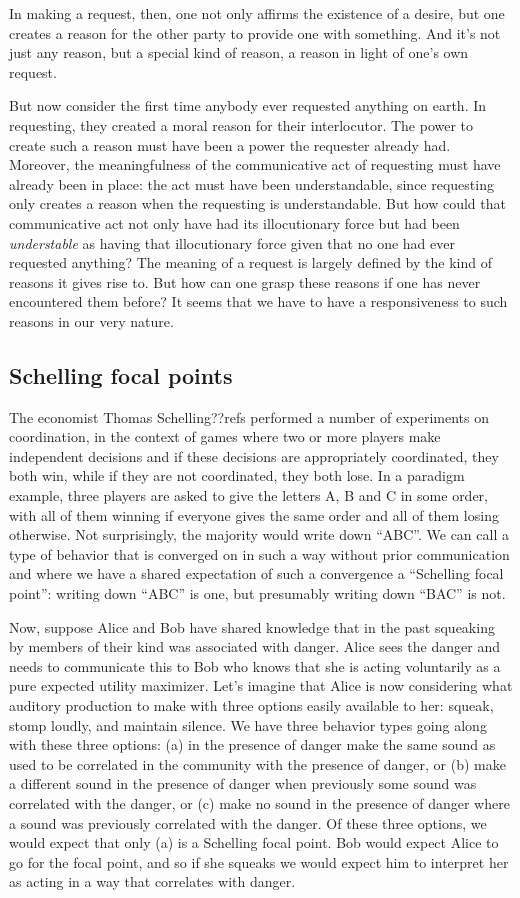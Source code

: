 In making a request, then, one not only affirms the existence of a desire, but one creates a reason for the other 
party to provide one with something. And it's not just any reason, but a special kind of reason, a reason in light of one's own request.

But now consider the first time anybody ever requested anything on earth. In requesting, they created a moral reason for their interlocutor. 
The power to create such a reason must have been a power the requester already had.  Moreover, the meaningfulness of 
the communicative act of requesting must have already been in place: the act must have been understandable, 
since requesting only creates a reason when the requesting is understandable. But how could that communicative act not only have had its illocutionary force but had been \textit{understable} as having that illocutionary 
force given that no one had ever requested anything? The meaning of a request is largely defined by the kind of reasons it gives
rise to. But how can one grasp these reasons if one has never encountered them before? It seems that we have to have
a responsiveness to such reasons in our very nature.

\subsection{Schelling focal points}
The economist Thomas Schelling??refs performed a number of experiments on coordination, in the context of 
games where two or more players make independent decisions and if these decisions are appropriately coordinated,
they both win, while if they are not coordinated, they both lose. In a paradigm example, three players are asked to
give the letters A, B and C in some order, with all of them winning if everyone gives the same order and all
of them losing otherwise. Not surprisingly, the majority would write down ``ABC''. We can call a type of behavior
that is converged on in such a way without prior communication and where we have a shared expectation of such a 
convergence a ``Schelling focal point'': writing down ``ABC'' is one, but presumably writing down ``BAC'' is not.

Now, suppose Alice and Bob have shared knowledge that in the  past squeaking by members of their kind was associated 
with danger. Alice sees the danger and needs to communicate this to Bob 
who knows that she is acting voluntarily as a pure expected utility maximizer. Let's imagine that Alice is now 
considering what auditory production
to make with three options easily available to her: squeak, stomp loudly, and maintain silence. We have
three behavior types going along with these three options: (a) in the presence of danger make the same sound as
used to be correlated in the community with the presence of danger, or (b) make a different sound in the presence
of danger when previously some sound was correlated with the danger, or (c) make no sound in the presence of 
danger where a sound was previously correlated with the danger. Of these three options, we would expect that only
(a) is a Schelling focal point. Bob would expect Alice to go for the focal point, and so if she squeaks we would
expect him to interpret her as acting in a way that correlates with danger.

